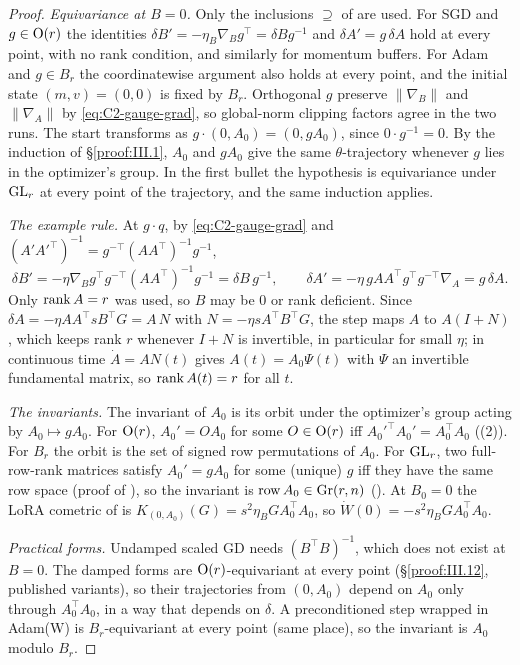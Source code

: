 \begin{proof}
\emph{Equivariance at $B=0$.} Only the inclusions $\supseteq$ of  are used. For SGD and $g\in\mathrm{O}(r)$
the identities $\delta B'=-\eta_B\nabla_Bg^\top=\delta Bg^{-1}$ and $\delta A'=g\,\delta A$ hold at every point, with no rank
condition, and similarly for momentum buffers. For Adam and $g\in B_r$ the coordinatewise argument also holds at every
point, and the initial state $(m,v)=(0,0)$ is fixed by $B_r$. Orthogonal $g$ preserve $\lVert\nabla_B\rVert$ and
$\lVert\nabla_A\rVert$ by \eqref{eq:C2-gauge-grad}, so global-norm clipping factors agree in the two runs. The start
transforms as $g\cdot(0,A_0)=(0,gA_0)$, since $0\cdot g^{-1}=0$. By the induction of \S\ref{proof:III.1}, $A_0$ and
$gA_0$ give the same $\theta$-trajectory whenever $g$ lies in the optimizer's group. In the first bullet the hypothesis is
equivariance under $\mathrm{GL}_r$ at every point of the trajectory, and the same induction applies.

\emph{The example rule.} At $g\cdot q$, by \eqref{eq:C2-gauge-grad} and
$(A'A'^\top)^{-1}=g^{-\top}(AA^\top)^{-1}g^{-1}$,
\[\delta B'=-\eta\nabla_Bg^\top g^{-\top}(AA^\top)^{-1}g^{-1}=\delta B\,g^{-1},\qquad
\delta A'=-\eta\,gAA^\top g^\top g^{-\top}\nabla_A=g\,\delta A .\]
Only $\operatorname{rank} A=r$ was used, so $B$ may be $0$ or rank deficient. Since $\delta A=-\eta AA^\top sB^\top G=A\,N$ with $N=-\eta sA^\top B^\top G$, the step maps $A$ to $A(I+N)$, which
keeps rank $r$ whenever $I+N$ is invertible, in particular for small $\eta$; in continuous time $\dot A=AN(t)$ gives
$A(t)=A_0\Psi(t)$ with $\Psi$ an invertible fundamental matrix, so $\operatorname{rank} A(t)=r$ for all $t$.

\emph{The invariants.} The invariant of $A_0$ is its orbit under the optimizer's group acting by $A_0\mapsto gA_0$. For
$\mathrm{O}(r)$, $A_0'=OA_0$ for some $O\in\mathrm{O}(r)$ iff $A_0'^\top A_0'=A_0^\top A_0$ ((2)). For $B_r$ the
orbit is the set of signed row permutations of $A_0$. For $\mathrm{GL}_r$, two full-row-rank matrices satisfy $A_0'=gA_0$ for some
(unique) $g$ iff they have the same row space (proof of ), so the invariant is
$\operatorname{row}A_0\in\operatorname{Gr}(r,n)$ (). At $B_0=0$ the LoRA cometric of  is
$K_{(0,A_0)}(G)=s^2\eta_BGA_0^\top A_0$, so $\dot W(0)=-s^2\eta_BGA_0^\top A_0$.

\emph{Practical forms.} Undamped scaled GD needs $(B^\top B)^{-1}$, which does not exist at $B=0$. The damped forms are
$\mathrm{O}(r)$-equivariant at every point (\S\ref{proof:III.12}, published variants), so their trajectories from $(0,A_0)$
depend on $A_0$ only through $A_0^\top A_0$, in a way that depends on $\delta$. A preconditioned step wrapped in Adam(W) is
$B_r$-equivariant at every point (same place), so the invariant is $A_0$ modulo $B_r$.


\end{proof}
